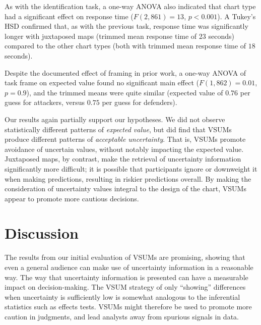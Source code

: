 \documentclass{vgtc}                          %
\begin{document}
As with the identification task, a one-way ANOVA also indicated that chart type had a significant effect on response time ($F(2,861)=13$, $p<0.001$). A Tukey's HSD confirmed that, as with the previous task, response time was significantly longer with juxtaposed maps (trimmed mean response time of $23$ seconds) compared to the other chart types (both with trimmed mean response time of $18$ seconds).

Despite the documented effect of framing in prior work, a one-way ANOVA of task frame on expected value found no significant main effect ($F(1,862)=0.01$, $p=0.9$), and the trimmed means were quite similar (expected value of $0.76$ per guess for attackers, versus $0.75$ per guess for defenders).

Our results again partially support our hypotheses. We did not observe statistically different patterns of \emph{expected value}, but did find that VSUMs produce different patterns of \emph{acceptable uncertainty}. That is, VSUMs promote avoidance of uncertain values, without notably impacting the expected value. Juxtaposed maps, by contrast, make the retrieval of uncertainty information significantly more difficult; it is possible that participants ignore or downweight it when making predictions, resulting in riskier predictions overall. By making the consideration of uncertainty values integral to the design of the chart, VSUMs appear to promote more cautious decisions.

\section{Discussion}

\sizeFig

The results from our initial evaluation of VSUMs are promising, showing that even a general audience can make use of uncertainty information in a reasonable way. The way that uncertainty information is presented can have a measurable impact on decision-making. The VSUM strategy of only ``showing'' differences when uncertainty is sufficiently low is somewhat analogous to the inferential statistics such as effects tests. VSUMs might therefore be used to promote more caution in judgments, and lead analysts away from spurious signals in data.
\end{document}
